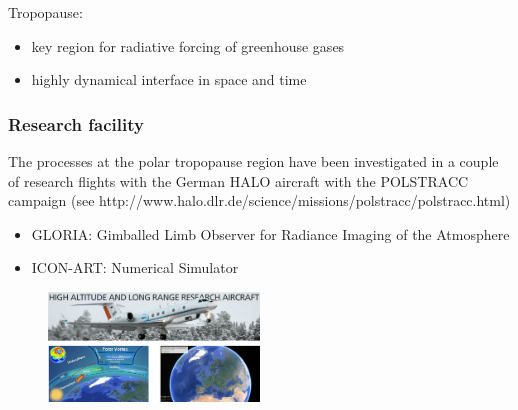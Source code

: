\documentclass[18pt]{beamer}
\begin{document}
\begin{frame}
		Tropopause: 
		\begin{itemize}
			\item key region for radiative forcing of greenhouse gases
			\item highly dynamical interface in space and time
		\end{itemize}
	
	\end{frame}


	\begin{frame}
	
		\frametitle{Research facility}
		The processes at the polar tropopause region have been investigated in a couple of research flights with the German HALO aircraft with the POLSTRACC campaign (see http://www.halo.dlr.de/science/missions/polstracc/polstracc.html)
		
		\begin{itemize}
			\item \small{GLORIA: Gimballed Limb Observer for Radiance Imaging of the Atmosphere}
			\item \small{ICON-ART: Numerical Simulator}
		\end{itemize}
	
		\begin{figure}
			\centering
			\includegraphics[width=0.5\textwidth]{airplane.png}
			
		\end{figure}
		
	\end{frame}
\end{document}
